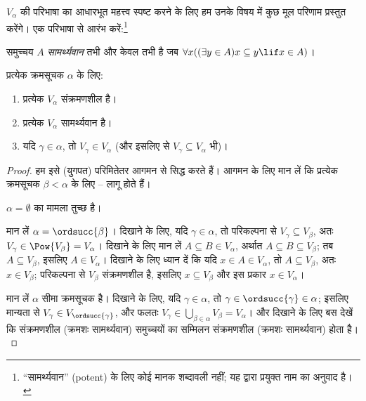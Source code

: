 \documentclass[../../../include/open-logic-section]{subfiles}
\begin{document}

$V_\alpha$ की परिभाषा का आधारभूत महत्त्व स्पष्ट करने के लिए हम उनके विषय
में कुछ मूल परिणाम प्रस्तुत करेंगे। एक परिभाषा से आरंभ करें:\footnote{
``सामर्थ्यवान'' (potent) के लिए कोई मानक शब्दावली नहीं; यह
\citet{ButtonLT1} द्वारा प्रयुक्त नाम का अनुवाद है।}
\begin{defn}
	समुच्चय $A$ \emph{सामर्थ्यवान} तभी और केवल तभी है जब
	$\forall x((\exists y \in A)x \subseteq y \lif x \in A)$।
\end{defn}
\begin{lem}
प्रत्येक क्रमसूचक $\alpha$ के लिए:
\begin{enumerate}
	\item{} प्रत्येक $V_\alpha$ संक्रमणशील है।
	\item{} प्रत्येक $V_\alpha$ सामर्थ्यवान है।
	\item{} यदि $\gamma \in \alpha$, तो
	$V_\gamma \in V_\alpha$ (और इसलिए  से
	$V_\gamma \subseteq V_\alpha$ भी)।
\end{enumerate}
\end{lem}

\begin{proof}
हम इसे (युगपत) परिमितेतर आगमन से सिद्ध करते हैं। आगमन के लिए मान लें कि
प्रत्येक क्रमसूचक $\beta < \alpha$ के लिए
-- लागू होते हैं।

$\alpha = \emptyset$ का मामला तुच्छ है।

मान लें $\alpha = \ordsucc{\beta}$।  दिखाने के लिए, यदि
$\gamma \in \alpha$, तो परिकल्पना से $V_\gamma \subseteq V_\beta$, अतः
$V_\gamma \in \Pow{V_\beta} = V_\alpha$।  दिखाने के
लिए मान लें $A \subseteq B \in V_\alpha$, अर्थात
$A \subseteq B \subseteq V_\beta$; तब $A \subseteq V_\beta$, इसलिए
$A \in V_\alpha$।  दिखाने के लिए ध्यान दें कि यदि
$x \in A \in V_\alpha$, तो $A \subseteq V_\beta$, अतः
$x \in V_\beta$; परिकल्पना से $V_\beta$ संक्रमणशील है, इसलिए
$x \subseteq V_\beta$ और इस प्रकार $x \in V_\alpha$।

मान लें $\alpha$ सीमा क्रमसूचक है।  दिखाने के लिए, यदि
$\gamma \in \alpha$, तो $\gamma \in \ordsucc{\gamma} \in \alpha$;
इसलिए मान्यता से $V_\gamma \in V_{\ordsucc{\gamma}}$, और फलतः
$V_\gamma \in \bigcup_{\beta \in \alpha} V_\beta = V_\alpha$।
 और  दिखाने के लिए बस देखें कि
संक्रमणशील (क्रमशः सामर्थ्यवान) समुच्चयों का सम्मिलन संक्रमणशील (क्रमशः
सामर्थ्यवान) होता है।
\end{proof}
\end{document}
